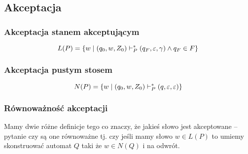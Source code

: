 \subsection{Akceptacja}
\subsubsection{Akceptacja stanem akceptującym}
\[
    L(P) = \set{ w \mid (q_0, w, Z_0) \vdash_P^* (q_F, \eps, \gamma) \land q_F \in F} 
\]

\subsubsection{Akceptacja pustym stosem}
\[
    N(P) = \set{ w \mid (q_0, w, Z_0) \vdash_P^* (q, \eps, \eps)}
\]

\subsubsection{Równoważność akceptacji}
Mamy dwie różne definicje tego co znaczy, że jakieś słowo jest akceptowane -- pytanie czy są one równoważne tj. czy jeśli mamy słowo \( w \in L(P) \) to umiemy skonstruować automat \( Q \) taki że \( w \in N(Q)  \) i na odwrót.

